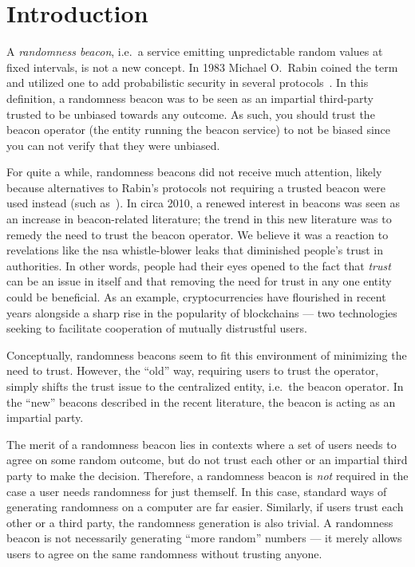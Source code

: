 \section{Introduction}
A \emph{randomness beacon}, i.e.\ a service emitting unpredictable random values at fixed intervals, is not a new concept.
In 1983 Michael O.\ Rabin coined the term and utilized one to add probabilistic security in several protocols~\cite{rabin1983transaction}.
In this definition, a randomness beacon was to be seen as an impartial third-party trusted to be unbiased towards any outcome.
As such, you should trust the beacon operator (the entity running the beacon service) to not be biased since you can not verify that they were unbiased.

For quite a while, randomness beacons did not receive much attention, likely because alternatives to Rabin's protocols not requiring a trusted beacon were used instead (such as~\cite{BGMR}).
In circa 2010, a renewed interest in beacons was seen as an increase in beacon-related literature; the trend in this new literature was to remedy the need to trust the beacon operator.
We believe it was a reaction to revelations like the \gls{nsa} whistle-blower leaks that diminished people's trust in authorities.
In other words, people had their eyes opened to the fact that \emph{trust} can be an issue in itself and that removing the need for trust in any one entity could be beneficial.
As an example, cryptocurrencies have flourished in recent years alongside a sharp rise in the popularity of blockchains --- two technologies seeking to facilitate cooperation of mutually distrustful users.

Conceptually, randomness beacons seem to fit this environment of minimizing the need to trust.
However, the \enquote{old} way, requiring users to trust the operator, simply shifts the trust issue to the centralized entity, i.e.\ the beacon operator.
In the \enquote{new} beacons described in the recent literature, the beacon is acting as an impartial party.

The merit of a randomness beacon lies in contexts where a set of users needs to agree on some random outcome, but do not trust each other or an impartial third party to make the decision.
Therefore, a randomness beacon is \emph{not} required in the case a user needs randomness for just themself.
In this case, standard ways of generating randomness on a computer are far easier.
Similarly, if users trust each other or a third party, the randomness generation is also trivial.
A randomness beacon is not necessarily generating \enquote{more random} numbers --- it merely allows users to agree on the same randomness without trusting anyone.

